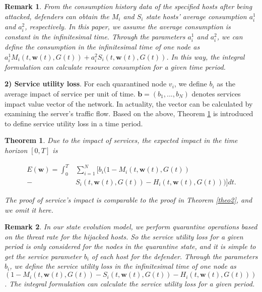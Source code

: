 \documentclass[lettersize,journal]{IEEEtran}
\newtheorem{theorem}{ \textbf{Theorem}}
\newtheorem{remark}{ \textbf{Remark}}
\begin{document}
\begin{remark}
 From the consumption history data of the specified hosts after being attacked, defenders can obtain the $M_i$ and $S_i$ state hosts' average consumption $a^1_i$ and $a^2_i$, respectively. In this paper, we assume the average consumption is constant in the infinitesimal time. Through the parameters $a^1_i$ and $a^2_i$, we can define the consumption in the infinitesimal time of one node as $a^1_i M_i(t,\bm{w}(t),G(t))+a^2_i S_i(t,\bm{w}(t),G(t))$. In this way, the integral formulation can calculate resource consumption for a given time period.
\end{remark}
\par
\textbf{2) Service utility loss}. For each quarantined node $v_i$, we define $b_i$ as the average impact of service per unit of time. $\bm{b}=(b_1,...,b_N)$ denotes services impact value vector of the network. In actuality, the vector can be calculated by examining the server's traffic flow. Based on the above, Theorem \ref{theo3} is introduced to define service utility loss in a time period.
\begin{theorem}\label{theo3}
Due to the impact of services, the expected impact in the time horizon $[0, T]$ is
\begin{small}
\begin{equation}\label{eq_effect function}
\begin{aligned}
   E(\bm{w}) =\int_0^T&\sum_{i=1}^N [b_i(1-M_i(t,\bm{w}(t),G(t))\\
   -&S_i(t,\bm{w}(t),G(t))-H_i(t,\bm{w}(t),G(t)))]dt.
\end{aligned}
\end{equation}
\end{small}
\begin{IEEEproof}
The proof of service's impact is comparable to the proof in Theorem \ref{theo2}, and we omit it here.
\end{IEEEproof}
\end{theorem}
\begin{remark}
In our state evolution model, we perform quarantine operations based on the threat rate for the hijacked hosts. So the service utility loss for a given period is only considered for the nodes in the quarantine state, and it is simple to get the service parameter $b_i$ of each host for the defender. Through the parameters $b_i$, we define the service utility loss in the infinitesimal time of one node as $(1-M_i(t,\bm{w}(t),G(t))-S_i(t,\bm{w}(t),G(t))-H_i(t,\bm{w}(t),G(t)))$. The integral formulation can calculate the service utility loss for a given period.
\end{remark}
\end{document}
